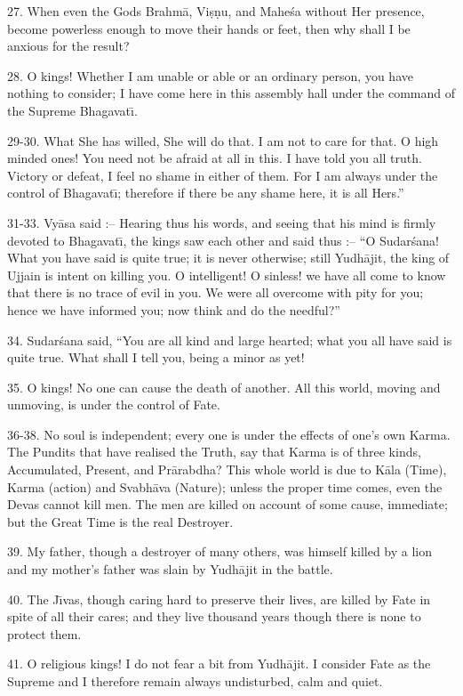 27. When even the Gods Brahm\=a, Vi\d{s}\d{n}u, and Mahe\'sa without Her presence, become powerless enough to move their hands or feet, then why shall I be anxious for the result?

28. O kings! Whether I am unable or able or an ordinary person, you have nothing to consider; I have come here in this assembly hall under the command of the Supreme Bhagavat\={\i}.

29-30. What She has willed, She will do that. I am not to care for that. O high minded ones! You need not be afraid at all in this. I have told you all truth. Victory or defeat, I feel no shame in either of them. For I am always under the control of Bhagavat\={\i}; therefore if there be any shame here, it is all Hers.''

31-33. Vy\=asa said :-- Hearing thus his words, and seeing that his mind is firmly devoted to Bhagavat\={\i}, the kings saw each other and said thus :-- ``O Sudar\'sana! What you have said is quite true; it is never otherwise; still Yudh\=ajit, the king of Ujjain is intent on killing you. O intelligent! O sinless! we have all come to know that there is no trace of evil in you. We were all overcome with pity for you; hence we have informed you; now think and do the needful?''

34. Sudar\'sana said, ``You are all kind and large hearted; what you all have said is quite true. What shall I tell you, being a minor as yet!

35. O kings! No one can cause the death of another. All this world, moving and unmoving, is under the control of Fate.

36-38. No soul is independent; every one is under the effects of one's own Karma. The Pundits that have realised the Truth, say that Karma is of three kinds, Accumulated, Present, and Pr\=arabdha? This whole world is due to K\=ala (Time), Karma (action) and Svabh\=ava (Nature); unless the proper time comes, even the Devas cannot kill men. The men are killed on account of some cause, immediate; but the Great Time is the real Destroyer.

39. My father, though a destroyer of many others, was himself killed by a lion and my mother's father was slain by Yudh\=ajit in the battle.

40. The J\={\i}vas, though caring hard to preserve their lives, are killed by Fate in spite of all their cares; and they live thousand years though there is none to protect them.

41. O religious kings! I do not fear a bit from Yudh\=ajit. I consider Fate as the Supreme and I therefore remain always undisturbed, calm and quiet.

